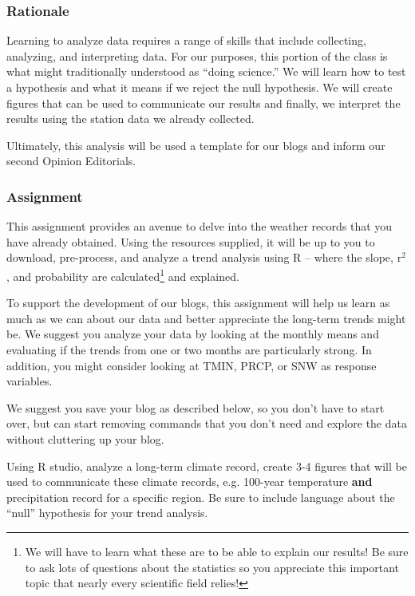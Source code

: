 
\subsubsection{Rationale}

Learning to analyze data requires a range of skills that include collecting, analyzing, and interpreting data. For our purposes, this portion of the class is what might traditionally understood as ``doing science.'' We will learn how to test a hypothesis and what it means if we reject the null hypothesis. We will create figures that can be used to communicate our results and finally, we interpret the results using the station data we already collected.

Ultimately, this analysis will be used a template for our blogs and inform our second Opinion Editorials. 

\subsubsection{Assignment}

This assignment provides an avenue to delve into the weather records that you have already obtained. Using the resources supplied, it will be up to you to download, pre-process, and analyze a trend analysis using R -- where the slope, r$^2$, and probability are calculated\footnote{We will have to learn what these are to be able to explain our results! Be sure to ask lots of questions about the statistics so you appreciate this important topic that nearly every scientific field relies!} and explained. 

{\color{red}To support the development of our blogs, this assignment will help us learn as much as we can about our data and better appreciate the long-term trends might be. We suggest you analyze your data by looking at the monthly means and evaluating if the trends from one or two months are particularly strong. In addition, you might consider looking at TMIN, PRCP, or SNW as response variables.

We suggest you save your blog as described below, so you don't have to start over, but can start removing commands that you don't need and explore the data without cluttering up your blog.} 

Using R studio, analyze a long-term climate record, create 3-4 figures that will be used to communicate these climate records, e.g. 100-year temperature \textbf{and} precipitation record for a specific region. Be sure to include language about the ``null'' hypothesis for your trend analysis. 

